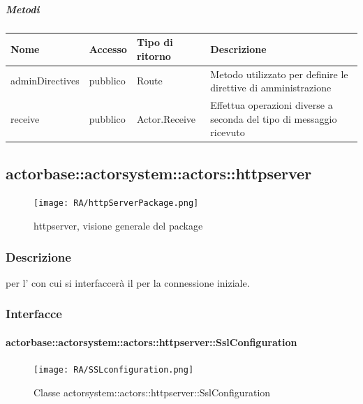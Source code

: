 \documentclass{scalatekids-article}
\begin{document}
\subparagraph{Metodi}

\begin{tabular}{| p{3cm} | p{1.5cm} | p{3.5cm} | p{9cm} |}
  \hline
  Nome & Accesso & Tipo di ritorno & Descrizione\\
  \hline
  adminDirectives & pubblico & Route & Metodo utilizzato per definire le direttive di amministrazione\\
  \hline
  receive & pubblico & Actor.Receive & Effettua operazioni diverse a seconda del tipo di messaggio ricevuto\\
  \hline
\end{tabular}


\subsection{actorbase::actorsystem::actors::httpserver}
\label{sec:actorbase::actorsystem::actors::httpserver}

\begin{figure}[H]
  \begin{center}
    \texttt{[image: RA/httpServerPackage.png]}
    \caption{httpserver, visione generale del package}
  \end{center}
\end{figure}

\subsubsection{Descrizione}
 per l' con cui si interfaccerà il  per la connessione iniziale.

\subsubsection{Interfacce}

\paragraph{actorbase::actorsystem::actors::httpserver::SslConfiguration}
\label{sec:actorbase::actorsystem::actors::httpserver::SslConfiguration}

\begin{figure}[H]
  \begin{center}
    \texttt{[image: RA/SSLconfiguration.png]}
    \caption{Classe actorsystem::actors::httpserver::SslConfiguration}
  \end{center}
\end{figure}
\end{document}
